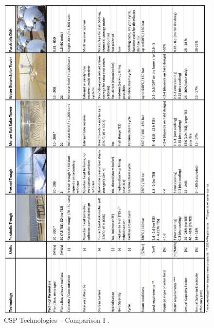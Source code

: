 \pagebreak
\begin{figure}[h]  
\centering
\includegraphics[height=0.95\textheight]{FIG/CSPOverview1}
\caption[CSP Technologies – Comparison I]{CSP Technologies – Comparison I \cite{Fichtner2010}.}\label{CSPOverview1}
\end{figure}
